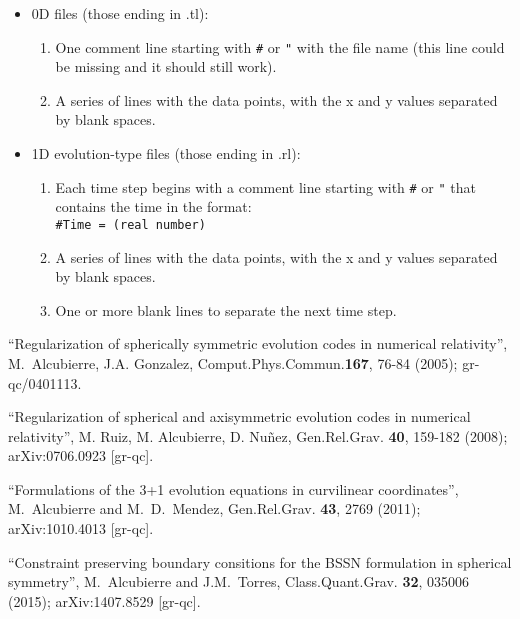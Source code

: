 \documentclass[12pt]{article}
\begin{document}
\begin{itemize}

\item 0D files (those ending in .tl):

\begin{enumerate}

\item One comment line starting with \texttt{\#} or \texttt{"} with
  the file name (this line could be missing and it should still work).

\item A series of lines with the data points, with the x and y values
  separated by blank spaces.

\end{enumerate}

\item 1D evolution-type files (those ending in .rl):

\begin{enumerate}

\item Each time step begins with a comment line starting with
  \texttt{\#} or \texttt{"} that contains the time in the format: \\

\texttt{\#Time = (real number)} \\

\item A series of lines with the data points, with the x and y values
  separated by blank spaces.

\item One or more blank lines to separate the next time step.

\end{enumerate}

\end{itemize}

\vspace{3mm}



\begin{thebibliography}{99}

 ``Regularization of spherically symmetric
  evolution codes in numerical relativity'', M.~Alcubierre,
  J.A. Gonzalez, Comput.Phys.Commun.{\bf 167}, 76-84 (2005);
  gr-qc/0401113.

 ``Regularization of spherical and axisymmetric
  evolution codes in numerical relativity'', M. Ruiz, M. Alcubierre,
  D. Nuñez, Gen.Rel.Grav. {\bf 40}, 159-182 (2008); arXiv:0706.0923
  [gr-qc].

 ``Formulations of the 3+1 evolution equations
  in curvilinear coordinates'', M.~Alcubierre and M.~D.~Mendez,
  Gen.Rel.Grav. {\bf 43}, 2769 (2011); arXiv:1010.4013 [gr-qc].

 ``Constraint preserving boundary consitions for
  the BSSN formulation in spherical symmetry'', M.~Alcubierre and
  J.M.~Torres, Class.Quant.Grav. {\bf 32}, 035006 (2015);
  arXiv:1407.8529 [gr-qc].

\end{thebibliography}


\end{document}
